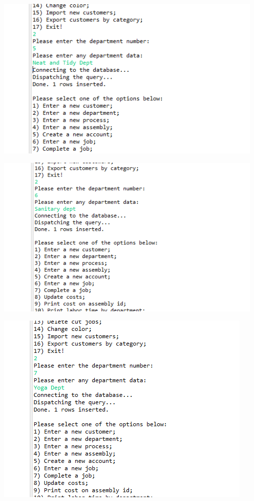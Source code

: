 \documentclass[11pt]{article}
\begin{document}
\includegraphics[width = \textwidth]{dept2.png}

\includegraphics[width = \textwidth]{dept3.png}

\includegraphics[width = \textwidth]{dept4.png}
\end{document}
